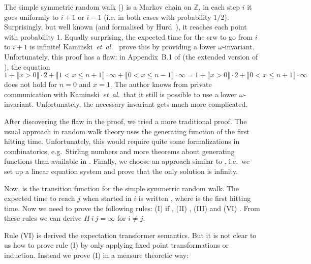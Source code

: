 \documentclass[a4paper]{llncs}
\newcommand{\etal}{\emph{et~al.}}
\begin{document}
The simple symmetric random walk () is a Markov chain on $\mathbb{Z}$, in each step $i$ it goes uniformly to $i + 1$ or $i - 1$ (i.e. in both cases with probability $1/2$).
Surprisingly, but well known (and formalised by Hurd~\cite{hurd2002thesis}), it reaches each point with probability $1$.
Equally surprising, the expected time for the srw to go from $i$ to $i + 1$ is infinite!
Kaminski~\etal~\cite{kaminski2016ert} prove this by providing a lower $\omega$-invariant.
Unfortunately, this proof has a flaw: in Appendix~B.1 of \cite{kaminski2016ert-ext} (the extended version of \cite{kaminski2016ert}), the equation $1 + \llbracket x > 0 \rrbracket \cdot 2 + \llbracket 1 < x \le n + 1 \rrbracket \cdot \infty + \llbracket 0 < x \le n - 1 \rrbracket \cdot \infty
= 1 + \llbracket x > 0 \rrbracket \cdot 2 + \llbracket 0 < x \le n + 1 \rrbracket \cdot \infty$
does not hold for $n=0$ and $x=1$. 
The author knows from private communication with Kaminski~\etal~that it still is possible to use a lower $\omega$-invariant.
Unfortunately, the necessary invariant gets much more complicated.

After discovering the flaw in the proof, we tried a more traditional proof.
The usual approach in random walk theory uses the generating function of the first hitting time.
Unfortunately, this would require quite some formalizations in combinatorics, e.g.~Stirling numbers and more theorems about generating functions than available in \cite{hoelzl2016mdp}. 
Finally, we choose an approach similar to \cite{hurd2002thesis}, i.e.~we set up a linear equation system and prove that the only solution is infinity.

Now,  is the transition function for the simple symmetric random walk.
The expected time to reach $j$ when started in $i$ is written , where  is the first hitting time.
Now we need to prove the following rules: (I)  if ,
(II) , (III)  and (VI) . From these rules we can derive $H~i~j = \infty$ for $i \not= j$.

Rule (VI) is derived the expectation transformer semantics.
But it is not clear to us how to prove rule (I) by only applying fixed point transformations or induction.
Instead we prove (I) in a measure theoretic way:
\end{document}
